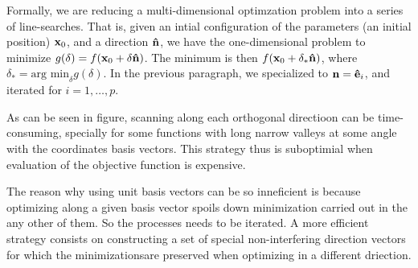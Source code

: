 Formally, we are reducing a multi-dimensional optimzation problem into a series of line-searches. That is, given an intial configuration of the parameters (an initial position) $\vb{x}_0$, and a direction $\vu{n}$, we have the one-dimensional problem to minimize $g(\delta)=f(\vb{x}_0 + \delta \vu{n})$. The minimum is  then $f(\vb{x}_0 + \delta_* \vu{n})$, where $\delta_* = \text{arg min}_\delta g(\delta)$. In the previous paragraph, we specialized to $\vb{n}=\vu{e}_i$, and iterated for $i=1,\dots, p$.


As can be seen in figure, scanning along each orthogonal directioon can be time-consuming, specially for some functions with long narrow valleys at some angle with the coordinates basis vectors. This strategy thus is suboptimial when evaluation of the objective function is expensive.

The reason why using unit basis vectors can be so inneficient is because optimizing along a given basis vector spoils down minimization carried out in the any other of them. So the processes needs to be iterated. A more efficient strategy consists on constructing a set of special non-interfering direction vectors for which the minimizationsare preserved when optimizing in a different driection.

